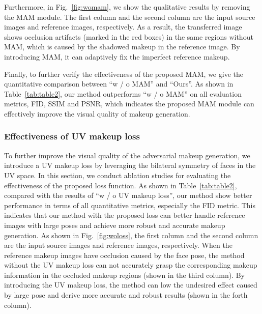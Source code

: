 \documentclass[10pt,journal,compsoc]{IEEEtran}
\begin{document}
Furthermore, in Fig.~\ref{fig:womam}, we show the qualitative results by removing the MAM module. The first column and the second column are the input source images and reference images, respectively. As a result, the transferred image shows occlusion artifacts (marked in the red boxes) in the same regions without MAM, which is caused by the shadowed makeup in the reference image. 
By introducing MAM, it can adaptively fix the imperfect reference makeup.

Finally, to further verify the effectiveness of the proposed MAM, we give the quantitative comparison between ``w / o MAM'' and ``Ours''. As shown in Table~\ref{tab:table2}, our method outperforms ``w / o MAM'' on all evaluation metrics, FID, SSIM and PSNR, which indicates the proposed MAM module can effectively improve the visual quality of makeup generation.

\subsubsection{Effectiveness of UV makeup loss}
To further improve the visual quality of the adversarial makeup generation, we introduce a UV makeup loss by leveraging the bilateral symmetry of faces in the UV space. In this section, we conduct ablation studies for evaluating the effectiveness of the proposed loss function. As shown in Table~\ref{tab:table2}, compared with the results of ``w / o UV makeup loss'', our method show better performance in terms of all quantitative metrics, especially the FID metric. This indicates that our method with the proposed loss can better handle reference images with large poses and achieve more robust and accurate makeup generation. As shown in Fig.~\ref{fig:woloss}, the first column and the second column are the input source images and reference images, respectively. When the reference makeup images have occlusion caused by the face pose, the method without the UV makeup loss can not accurately grasp the corresponding makeup information in the occluded makeup regions (shown in the third column). By introducing the UV makeup loss, the method can low the undesired effect caused by large pose and derive more accurate and robust results (shown in the forth column).
\end{document}
